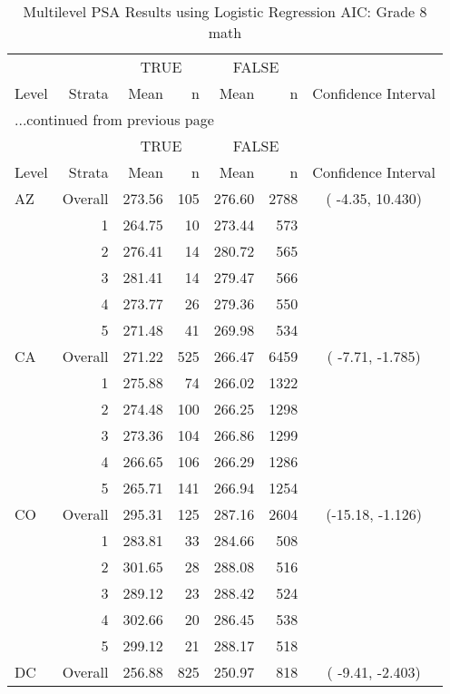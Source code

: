 \begin{longtable}{lrrr@{\extracolsep{.25cm}}rrc}
\caption{Multilevel PSA Results using Logistic Regression AIC: Grade 8 math} \\ 
   \hline & & \multicolumn{2}{c}{TRUE} & \multicolumn{2}{c}{FALSE} & \\ \cline{3-4} \cline{5-6} Level & Strata & Mean & n & Mean & n & Confidence Interval \\ \hline\endfirsthead \multicolumn{7}{l}{{...continued from previous page}}\\ \hline  & & \multicolumn{2}{c}{TRUE} & \multicolumn{2}{c}{FALSE} & \\ \cline{3-4} \cline{5-6} Level & Strata & Mean & n & Mean & n & Confidence Interval \\ \hline \endhead \endfoot \endlastfoot  \hline
AZ & Overall & 273.56 & 105 & 276.60 & 2788 & ( -4.35,  10.430) \\ 
   & 1 & 264.75 &  10 & 273.44 & 573 &  \\ 
   & 2 & 276.41 &  14 & 280.72 & 565 &  \\ 
   & 3 & 281.41 &  14 & 279.47 & 566 &  \\ 
   & 4 & 273.77 &  26 & 279.36 & 550 &  \\ 
   & 5 & 271.48 &  41 & 269.98 & 534 &  \\ 
   \hline
CA & Overall & 271.22 & 525 & 266.47 & 6459 & ( -7.71,  -1.785) \\ 
   & 1 & 275.88 &  74 & 266.02 & 1322 &  \\ 
   & 2 & 274.48 & 100 & 266.25 & 1298 &  \\ 
   & 3 & 273.36 & 104 & 266.86 & 1299 &  \\ 
   & 4 & 266.65 & 106 & 266.29 & 1286 &  \\ 
   & 5 & 265.71 & 141 & 266.94 & 1254 &  \\ 
   \hline
CO & Overall & 295.31 & 125 & 287.16 & 2604 & (-15.18,  -1.126) \\ 
   & 1 & 283.81 &  33 & 284.66 & 508 &  \\ 
   & 2 & 301.65 &  28 & 288.08 & 516 &  \\ 
   & 3 & 289.12 &  23 & 288.42 & 524 &  \\ 
   & 4 & 302.66 &  20 & 286.45 & 538 &  \\ 
   & 5 & 299.12 &  21 & 288.17 & 518 &  \\ 
   \hline
DC & Overall & 256.88 & 825 & 250.97 & 818 & ( -9.41,  -2.403) \\ 

\end{longtable}
